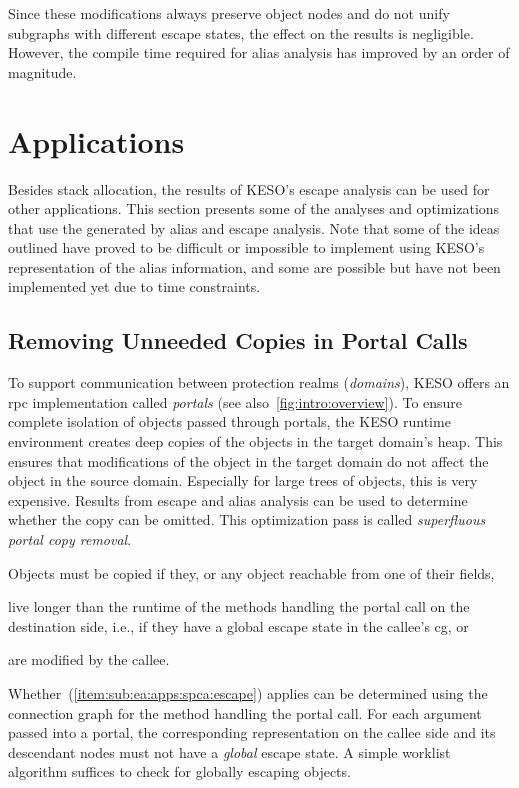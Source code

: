 				Since these modifications always preserve object nodes and do not unify subgraphs with different escape states,
				the effect on the results is negligible. However, the compile time required for alias analysis has improved by
				an order of magnitude.

	\section{Applications}
		\label{sec:ea:apps}
		Besides stack allocation, the results of KESO's escape analysis can be used for other applications. This section
		presents some of the analyses and optimizations that use the  generated by alias and escape analysis.
		Note that some of the ideas outlined have proved to be difficult or impossible to implement using KESO's
		representation of the alias information, and some are possible but have not been implemented yet due to time
		constraints.

		\subsection{Removing Unneeded Copies in Portal Calls}
			\label{sub:ea:apps:spca}
			To support communication between protection realms (\emph{domains}), KESO offers an \gls{rpc} implementation
			called \emph{portals} (see also~\cref{fig:intro:overview}). To ensure complete isolation of objects passed through
			portals, the KESO runtime environment creates deep copies of the objects in the target domain's heap. This ensures
			that modifications of the object in the target domain do not affect the object in the source domain. Especially
			for large trees of objects, this is very expensive. Results from escape and alias analysis can be used to
			determine whether the copy can be omitted. This optimization pass is called \emph{superfluous portal copy
			removal}.

			Objects must be copied if they, or any object reachable from one of their fields, \begin{inparaenum}[(a)]
				\item live longer than the runtime of the methods handling the portal call on the destination side, i.e., if
					they have a global escape state in the callee's \gls{cg}, or \label{item:sub:ea:apps:spca:escape}
				\item are modified by the callee. \label{item:sub:ea:apps:spca:write}
			\end{inparaenum} Whether~(\ref{item:sub:ea:apps:spca:escape}) applies can be determined using the connection graph
			for the method handling the portal call. For each argument passed into a portal, the corresponding representation
			on the callee side and its descendant nodes must not have a \emph{global} escape state. A simple worklist
			algorithm suffices to check for globally escaping objects.

